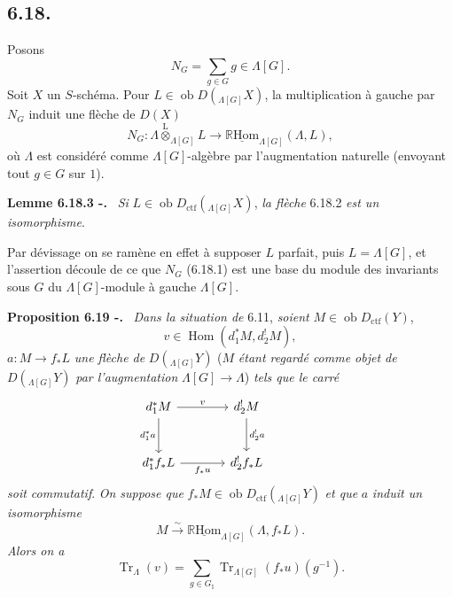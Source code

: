 \documentclass[11pt]{article}
\newenvironment{statement}[1]{\par\medskip\noindent\textbf{#1.}\ }{\par\medskip}
\DeclareMathOperator{\Hom}{Hom}
\newcommand{\R}{\mathbb{R}}\newcommand{\RHomCore}{\mathbb{R}\mathrm{Hom}}
\providecommand{\RHom}{\RHomCore}
\providecommand{\uRHom}{\underline{\RHom}}
\providecommand{\Tr}{\operatorname{Tr}}
\providecommand{\Tr}{\operatorname{Tr}}
\providecommand{\lten}{\overset{\mathrm L}{\otimes}}
\providecommand{\Ob}{\operatorname{ob}}
\providecommand{\Tr}{\operatorname{Tr}}
\providecommand{\RHom}{\RHomCore}
\providecommand{\Hom}{\operatorname{Hom}}
\providecommand{\lten}{\overset{\mathrm L}{\otimes}}
\providecommand{\RHom}{\R\mathcal{H}om}
\providecommand{\lten}{\overset{\mathrm L}{\otimes}}
\providecommand{\Ob}{\operatorname{ob}}
\providecommand{\R}{\mathrm R}
\providecommand{\Tr}{\operatorname{Tr}}
\providecommand{\lten}{\overset{\mathrm L}{\otimes}}
\providecommand{\lten}{\overset{\mathrm L}{\otimes}}
\providecommand{\Ob}{\operatorname{Ob}}
\providecommand{\lten}{\overset{\mathrm L}{\otimes}}
\providecommand{\RHom}{\RHomCore}
\providecommand{\Hom}{\operatorname{Hom}}
\providecommand{\Tr}{\operatorname{Tr}}
\providecommand{\Ob}{\operatorname{ob}}
\providecommand{\Ob}{\operatorname{Ob}}
\providecommand{\lten}{\overset{\mathrm L}{\otimes}}
\begin{document}
\subsection*{6.18.}
Posons
\begin{equation}
N_G=\sum_{g\in G} g\in\Lambda[G].
\tag{6.18.1}
\end{equation}
Soit $X$ un $S$-schéma. Pour $L\in\Ob D({}_{\Lambda[G]}X)$, la multiplication à gauche par $N_G$ induit une flèche de $D(X)$
\begin{equation}
N_G:\Lambda\lten_{\Lambda[G]}L
\longrightarrow
\uRHom_{\Lambda[G]}(\Lambda,L),
\tag{6.18.2}
\end{equation}
où $\Lambda$ est considéré comme $\Lambda[G]$-algèbre par l'augmentation naturelle (envoyant tout $g\in G$ sur $1$).

\begin{statement}{Lemme 6.18.3 -}
\emph{Si} $L\in\Ob D_{\mathrm{ctf}}({}_{\Lambda[G]}X)$, \emph{la flèche} 6.18.2 \emph{est un isomorphisme}.
\end{statement}

Par dévissage on se ramène en effet à supposer $L$ parfait, puis $L=\Lambda[G]$, et l'assertion découle de ce que $N_G$ (6.18.1) est une base du module des invariants sous $G$ du $\Lambda[G]$-module à gauche $\Lambda[G]$.

\begin{statement}{Proposition 6.19 -}
\emph{Dans la situation de} 6.11, \emph{soient} $M\in\Ob D_{\mathrm{ctf}}(Y)$,
\[
v\in\Hom(d_1^*M,d_2^!M),
\]
$a:M\to f_*L$ \emph{une flèche de} $D({}_{\Lambda[G]}Y)$ ($M$ \emph{étant regardé comme objet de} $D({}_{\Lambda[G]}Y)$ \emph{par l'augmentation} $\Lambda[G]\to\Lambda$) \emph{tels que le carré}
\[
\begin{tikzcd}[column sep=large,row sep=large]
d_1^*M \arrow[r,"v"] \arrow[d,"d_1^*a"'] & d_2^!M \arrow[d,"d_2^!a"] & {}\\
d_1^*f_*L \arrow[r,"f_*u"'] & d_2^!f_*L
\end{tikzcd}
\]
\emph{soit commutatif}. \emph{On suppose que} $f_*M\in\Ob D_{\mathrm{ctf}}({}_{\Lambda[G]}Y)$ \emph{et que} $a$ \emph{induit un isomorphisme}
\[
M\xrightarrow{\sim}\uRHom_{\Lambda[G]}(\Lambda,f_*L).
\]
\emph{Alors on a}
\begin{equation}
\Tr_{\Lambda}(v)=
\sum_{g\in G_{\natural}}\Tr_{\Lambda[G]}(f_*u)(g^{-1}).
\tag{6.19.1}
\end{equation}
\end{statement}
\end{document}
